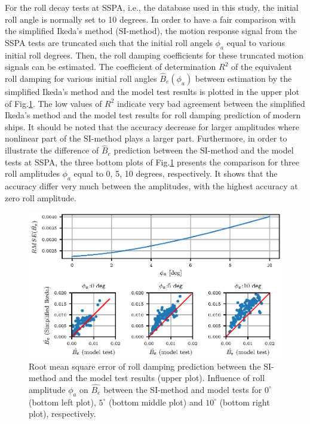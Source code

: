 For the roll decay tests at SSPA, i.e., the database used in this study, the initial roll angle is normally set to 10 degrees. In order to have a fair comparison with the simplified Ikeda's method (SI-method), the motion response signal from the SSPA tests are truncated such that the initial roll angels $\phi_a$ equal to various initial roll degrees. Then, the roll damping coefficients for these truncated motion signals can be estimated. The coefficient of determination $R^2$ of the equivalent roll damping for various initial roll angles $\hat{B}_e(\phi_a)$ between estimation by the simplified Ikeda's method and the model test results is plotted in the upper plot of Fig.\ref{fig:ikeda_phi_a}. The low values of $R^2$ indicate very bad agreement between the simplified Ikeda's method and the model test results for roll damping prediction of modern ships. It should be noted that the accuracy decrease for larger amplitudes where nonlinear part of the SI-method plays a larger part. Furthermore, in order to illustrate the difference of $\hat{B}_e$ prediction between the SI-method and the model tests at SSPA, the three bottom plots of Fig.\ref{fig:ikeda_phi_a} presents the comparison for three roll amplitudes $\phi_a$ equal to 0, 5, 10 degrees, respectively. It shows that the accuracy differ very much between the amplitudes, with the highest accuracy at zero roll amplitude. 


\begin{figure}[H]
\centering
  \centering
  \includegraphics[]{figures/ikeda_phi_a.eps}
  \vspace{-0.5cm}
  \caption{Root mean square error of roll damping prediction between the SI-method and the model test results (upper plot). Influence of roll amplitude $\phi_a$ on $\hat{B_e}$ between the SI-method and model tests for $0^{\circ}$ (bottom left plot), $5^{\circ}$ (bottom middle plot) and $10^{\circ}$ (bottom right plot), respectively.}
  \label{fig:ikeda_phi_a}
\end{figure}


